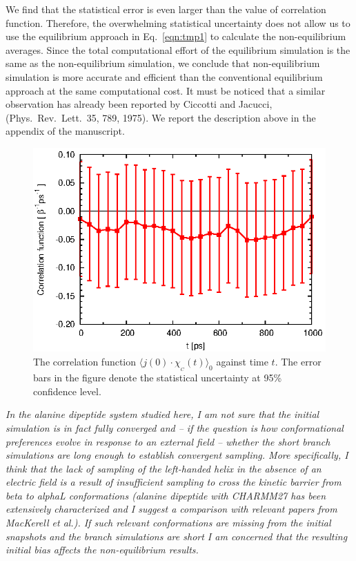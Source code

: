 \documentclass[]{revtex4-1}
\begin{document}
We find that the statistical error is even larger than the value of
correlation function.  Therefore, the
overwhelming statistical uncertainty does not allow us to use the equilibrium approach 
in Eq.~\eqref{eqn:tmp1} to calculate the
non-equilibrium averages. 
Since the total computational effort of
the equilibrium simulation is the same as the non-equilibrium
simulation, we conclude that non-equilibrium simulation is more
accurate and efficient than the conventional equilibrium approach  at the same computational cost.
It must be noticed that a similar
observation has already been reported by Ciccotti and Jacucci, (Phys.~Rev.~Lett.~35, 789, 1975). We report the description above in the appendix of the manuscript.
\\
\begin{figure}
  \centering
  \includegraphics{figs/fig-corr-meta.eps}
  \caption{The correlation function $\langle j(0)\cdot \chi_{_C}(t)
    \rangle_0$ against time $t$. The error bars in the figure denote
    the statistical uncertainty at 95\% confidence level. }
  \label{fig:tmp1}
\end{figure}


\emph{
In the alanine dipeptide system studied here, I am not sure that the
initial simulation is in fact fully converged and -- if the question is
how conformational preferences evolve in response to an external field
-- whether the short branch simulations are long enough to establish
convergent sampling. More specifically, I think that the lack of
sampling of the left-handed helix in the absence of an electric field
is a result of insufficient sampling to cross the kinetic barrier from
beta to alphaL conformations (alanine dipeptide with CHARMM27 has been
extensively characterized and I suggest a comparison with relevant
papers from MacKerell et al.). If such relevant conformations are
missing from the initial snapshots and the branch simulations are
short I am concerned that the resulting initial bias affects the
non-equilibrium results.
}\\
\end{document}
